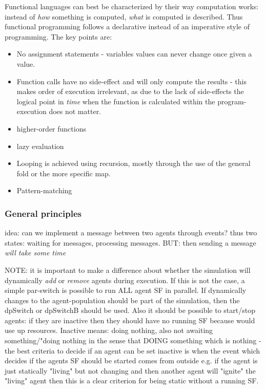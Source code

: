 Functional languages can best be characterized by their way computation works: instead of \textit{how} something is computed, \textit{what} is computed is described. Thus functional programming follows a declarative instead of an imperative style of programming. The key points are:
\begin{itemize}
\item No assignment statements - variables values can never change once given a value.
\item Function calls have no side-effect and will only compute the results - this makes order of execution irrelevant, as due to the lack of side-effects the logical point in \textit{time} when the function is calculated within the program-execution does not matter.
\item higher-order functions
\item lazy evaluation
\item Looping is achieved using recursion, mostly through the use of the general fold or the more specific map.
\item Pattern-matching
\end{itemize}

\subsubsection{General principles}
idea: can we implement a message between two agents through events? thus two states: waiting for messages, processing messages. BUT: then sending a message \textit{will take some time}

NOTE: it is important to make a difference about whether the simulation will dynamically \textit{add} or \textit{remove} agents during execution. If this is not the case, a simple par-switch is possible to run ALL agent SF in parallel. If dynamically changes to the agent-population should be part of the simulation, then the dpSwitch or dpSwitchB should be used. Also it should be possible to start/stop agents: if they are inactive then they should have no running SF because would use up resources. Inactive means: doing nothing, also not awaiting something/"doing nothing in the sense that DOING something which is nothing - the best criteria to decide if an agent can be set inactive is when the event which decides if the agents SF should be started comes from outside e.g. if the agent is just statically "living" but not changing and then another agent will "ignite" the "living" agent then this is a clear criterion for being static without a running SF. \\

